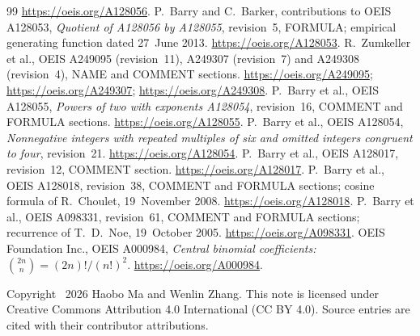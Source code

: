 \documentclass[11pt]{article}
\begin{document}
\begin{thebibliography}{99}
\url{https://oeis.org/A128056}.
P.~Barry and C.~Barker, contributions to OEIS A128053,
\emph{Quotient of A128056 by A128055}, revision~5,
FORMULA; empirical generating function dated 27~June 2013.
\url{https://oeis.org/A128053}.
R.~Zumkeller et al., OEIS A249095 (revision~11), A249307 (revision~7)
and A249308 (revision~4), NAME and COMMENT sections.
\url{https://oeis.org/A249095}; \url{https://oeis.org/A249307};
\url{https://oeis.org/A249308}.
P.~Barry et al., OEIS A128055, \emph{Powers of two with exponents A128054},
revision~16, COMMENT and FORMULA sections.
\url{https://oeis.org/A128055}.
P.~Barry et al., OEIS A128054, \emph{Nonnegative integers with repeated
multiples of six and omitted integers congruent to four}, revision~21.
\url{https://oeis.org/A128054}.
P.~Barry et al., OEIS A128017, revision~12, COMMENT section.
\url{https://oeis.org/A128017}.
P.~Barry et al., OEIS A128018, revision~38, COMMENT and FORMULA sections;
cosine formula of R.~Choulet, 19~November 2008.
\url{https://oeis.org/A128018}.
P.~Barry et al., OEIS A098331, revision~61, COMMENT and FORMULA sections;
recurrence of T.~D.~Noe, 19~October 2005.
\url{https://oeis.org/A098331}.
OEIS Foundation Inc., OEIS A000984,
\emph{Central binomial coefficients: $\binom{2n}{n}=(2n)!/(n!)^2$}.
\url{https://oeis.org/A000984}.
\end{thebibliography}
\medskip
\noindent\small Copyright \textcopyright\ 2026 Haobo Ma and Wenlin Zhang.
This note is licensed under Creative Commons Attribution 4.0 International
(CC BY 4.0). Source entries are cited with their contributor attributions.
\end{document}
